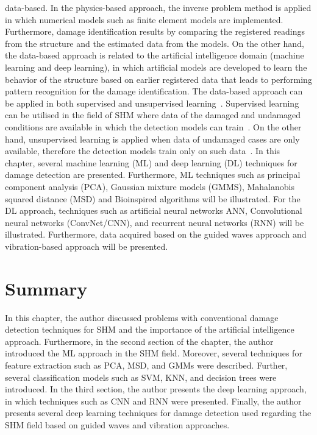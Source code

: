 \documentclass[b5paper, 11pt, openany, titlepage]{book}
\begin{document}
data-based.
In the physics-based approach, the inverse problem method is applied in which numerical models such as finite element models are implemented. 
Furthermore, damage identification results by comparing the registered readings from the structure and the estimated data from the models.
On the other hand,  the data-based approach is related to the artificial intelligence domain (machine learning and deep learning), in which artificial models are developed to learn the behavior of the structure based on earlier registered data that leads to performing pattern recognition for the damage identification.
The data-based approach can be applied in both supervised and unsupervised learning~\cite{worden2007application}.
Supervised learning can be utilised in the field of SHM where data of the damaged and undamaged conditions are available in which the detection models can train~\cite{figueiredo2018machine}.
On the other hand, unsupervised learning is applied when data of undamaged cases are only available, therefore the detection models train only on such data~\cite{figueiredo2018machine}. 
In this chapter, several machine learning (ML) and deep learning (DL) techniques for damage detection are presented.
Furthermore, ML techniques such as principal component analysis (PCA), Gaussian mixture models (GMMS), Mahalanobis squared distance (MSD) and Bioinspired algorithms will be illustrated.
For the DL approach, techniques such as artificial neural networks ANN, Convolutional neural networks (ConvNet/CNN), and recurrent neural networks (RNN) will be illustrated.
Furthermore, data acquired based on the guided waves approach and vibration-based approach will be presented. 




\section{Summary}
In this chapter, the author discussed problems with conventional damage detection techniques for SHM and the importance of the artificial intelligence approach.
Furthermore, in the second section of the chapter, the author introduced the ML approach in the SHM field.
Moreover, several techniques for feature extraction such as PCA, MSD, and GMMs were described. 
Further, several classification models such as SVM, KNN, and decision trees were introduced.
In the third section, the author presents the deep learning approach, in which techniques such as CNN  and RNN were presented.
Finally, the author presents several deep learning techniques for damage detection used regarding the SHM field based on guided waves and vibration approaches.
\end{document}

